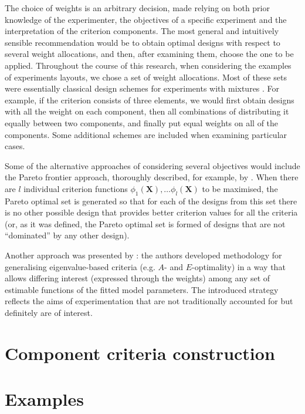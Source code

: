 \documentclass[11pt]{article}
\begin{document}
The choice of weights is an arbitrary decision, made relying on both prior knowledge of the experimenter, the objectives of a specific experiment and the interpretation of the criterion components. The most general and intuitively sensible recommendation would be to obtain optimal designs with respect to several weight allocations, and then, after examining them, choose the one to be applied. Throughout the course of this research, when considering the examples of experiments layouts, we chose a set of weight allocations. Most of these sets were essentially classical design schemes for experiments with mixtures \citep{Cornell2011Mixtures}. For example, if the criterion consists of three elements, we would first obtain designs with all the weight on each component, then all combinations of distributing it equally between two components, and finally put equal weights on all of the components. Some additional schemes are included when examining particular cases.  

Some of the alternative approaches of considering several objectives would include the Pareto frontier approach, thoroughly described, for example, by \cite{Lu2011optimization}. When there are $l$ individual criterion functions $\phi_1(\bm{X}),\ldots\phi_{l}(\bm{X})$ to be maximised, the Pareto optimal set is generated so that for each of the designs from this set there is no other possible design that provides better criterion values for all the criteria (or, as it was defined, the Pareto optimal set is formed of designs that are not ``dominated'' by any other design).

Another approach was presented by \cite{Stallings2015general}: the authors developed methodology for generalising eigenvalue-based criteria (e.g. $A$- and $E$-optimality) in a way that allows differing interest (expressed through the weights) among any set of estimable functions of the fitted model parameters. The introduced strategy reflects the aims of experimentation that are not traditionally accounted for but definitely are of interest.

\section{Component criteria construction}
\label{ch::compound_criteria}


\section{Examples}
\label{ch::compound_examples}

\end{document}
